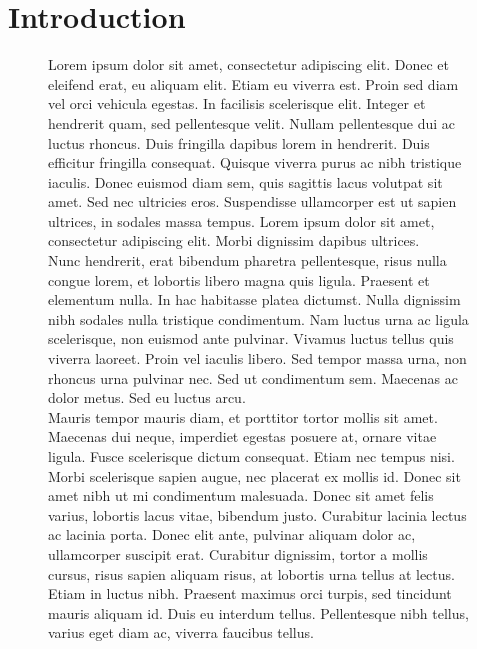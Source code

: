 \documentclass[12pt]{article}
\theoremstyle{definition}\newtheorem{defn}{Définition}
\theoremstyle{definition}\newtheorem{exm}{Exemple}
\theoremstyle{definition}\newtheorem{rem}{Remarque}
\theoremstyle{definition}\newtheorem{algo}{Algorithme}
\theoremstyle{remark}\newtheorem{exo}{Exercice}
\theoremstyle{remark}\newtheorem{nota}{Notation}
\begin{document}
\section*{Introduction}
\begin{figure}[h]
Lorem ipsum dolor sit amet, consectetur adipiscing elit. Donec et eleifend erat, eu aliquam elit. Etiam eu viverra est. Proin sed diam vel orci vehicula egestas. In facilisis scelerisque elit. Integer et hendrerit quam, sed pellentesque velit. Nullam pellentesque dui ac luctus rhoncus. Duis fringilla dapibus lorem in hendrerit. Duis efficitur fringilla consequat. Quisque viverra purus ac nibh tristique iaculis. Donec euismod diam sem, quis sagittis lacus volutpat sit amet. Sed nec ultricies eros. Suspendisse ullamcorper est ut sapien ultrices, in sodales massa tempus. Lorem ipsum dolor sit amet, consectetur adipiscing elit. Morbi dignissim dapibus ultrices.\\

Nunc hendrerit, erat bibendum pharetra pellentesque, risus nulla congue lorem, et lobortis libero magna quis ligula. Praesent et elementum nulla. In hac habitasse platea dictumst. Nulla dignissim nibh sodales nulla tristique condimentum. Nam luctus urna ac ligula scelerisque, non euismod ante pulvinar. Vivamus luctus tellus quis viverra laoreet. Proin vel iaculis libero. Sed tempor massa urna, non rhoncus urna pulvinar nec. Sed ut condimentum sem. Maecenas ac dolor metus. Sed eu luctus arcu.\\

Mauris tempor mauris diam, et porttitor tortor mollis sit amet. Maecenas dui neque, imperdiet egestas posuere at, ornare vitae ligula. Fusce scelerisque dictum consequat. Etiam nec tempus nisi. Morbi scelerisque sapien augue, nec placerat ex mollis id. Donec sit amet nibh ut mi condimentum malesuada. Donec sit amet felis varius, lobortis lacus vitae, bibendum justo. Curabitur lacinia lectus ac lacinia porta. Donec elit ante, pulvinar aliquam dolor ac, ullamcorper suscipit erat. Curabitur dignissim, tortor a mollis cursus, risus sapien aliquam risus, at lobortis urna tellus at lectus. Etiam in luctus nibh. Praesent maximus orci turpis, sed tincidunt mauris aliquam id. Duis eu interdum tellus. Pellentesque nibh tellus, varius eget diam ac, viverra faucibus tellus.
\end{figure}

\vfill \eject


\pagebreak 
\end{document}

